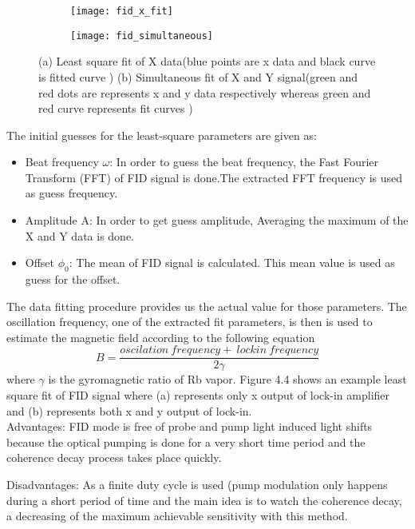 \documentclass[12pt]{report}
\begin{document}
\begin{itemize}
\begin{figure}
    \begin{subfigure}[b]{0.45\textwidth}
        \centering
        \texttt{[image: fid\_x\_fit]}
        \caption{}
        \label{fig:three sin x}
    \end{subfigure}
    \hfill
    \begin{subfigure}[b]{0.45\textwidth}
        \centering
        \texttt{[image: fid\_simultaneous]}
        \caption{}
        \label{fig:five over x}
    \end{subfigure}
    \caption{(a) Least square fit of X data(blue points are x data and black curve is fitted curve ) (b) Simultaneous fit of X and Y signal(green and red dots are represents x and y data respectively whereas green and red curve represents fit curves ) }
    \label{fig:three graphs}
\end{figure}

The initial guesses for the least-square parameters are given
as:
\begin{itemize}
\item
Beat frequency $\omega$: In order to guess the beat frequency, the Fast Fourier Transform (FFT) of FID signal is done.The extracted FFT frequency is used as guess frequency.
\item
Amplitude A: In order to get guess amplitude, Averaging the maximum of the X and Y data is done.
\item
Offset $\phi_0$: The mean of FID signal is calculated. This mean value is used as guess for the offset. 

\end{itemize}
The data fitting procedure provides us the actual value for those parameters. The oscillation frequency, one of the extracted fit parameters, is then is used to estimate the magnetic field according to the following equation
\begin{equation}
B= \frac{oscilation ~ frequency +~lock in~ frequency}{2\gamma}
\end{equation}
where $\gamma$ is the gyromagnetic ratio of Rb vapor. Figure 4.4 shows an example least square fit of FID signal where (a) represents only x output of lock-in amplifier and (b) represents both x and y output of lock-in.\\
Advantages: FID mode is free of probe and pump light induced light shifts because the optical pumping is done for a very short time period and the coherence decay process takes place quickly. 

Disadvantages: As a finite duty cycle is used (pump modulation only happens during a short period of time and the main idea is to watch the coherence decay, a decreasing of the maximum achievable sensitivity with this method.


\end{itemize}
\end{document}
